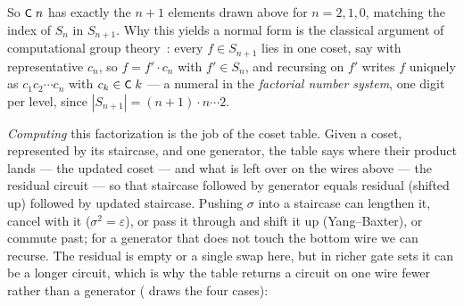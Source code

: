\noindent So $\mbox{\textsf{\small C}}\;n$ has exactly the $n{+}1$ elements drawn above
for $n = 2, 1, 0$, matching the index of $S_n$ in $S_{n+1}$.  Why this yields
a normal form is the classical argument of computational group
theory~\cite{sims1994computation,holt2005handbook}:
every $f \in S_{n+1}$ lies in one coset, say with representative $c_n$,
so $f = f' \cdot c_n$ with $f' \in S_n$, and recursing on $f'$ writes $f$
uniquely as $c_1 c_2 \cdots c_n$ with $c_k \in \mbox{\textsf{\small C}}\;k$ --- a numeral
in the \emph{factorial number system}, one digit per level, since
$|S_{n+1}| = (n{+}1) \cdot n \cdots 2$.

\emph{Computing} this factorization is the job of the coset table.
Given a coset, represented by its staircase, and one generator, the
table says where their product lands --- the updated coset --- and what
is left over on the wires above --- the residual circuit --- so that
staircase followed by generator equals residual (shifted up) followed by
updated staircase.
Pushing $\sigma$ into a staircase can lengthen it, cancel with it ($\sigma^2 =
\varepsilon$), or pass it through and shift it up (Yang--Baxter), or
commute past; for a generator that does not touch the bottom wire we can
recurse.  The residual is empty or a single swap here, but in richer
gate sets it can be a longer circuit, which is why the table returns a
circuit on one wire fewer rather than a generator
( draws the four cases):

